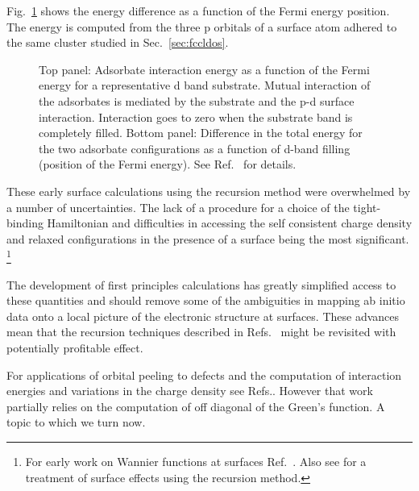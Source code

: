 %

Fig.~\ref{fig:burkesurface} shows the energy difference as a function of the 
Fermi energy position. The energy is computed from the three p orbitals of a 
surface atom adhered to the same cluster studied in Sec.~\ref{sec:fccldos}.
%
\begin{figure}
\begin{center}
{\graphicspath{{./invariance/rec_examples/exorpeel/}}}
\caption{Top panel: Adsorbate interaction energy as a function of the Fermi energy for a representative d band
substrate. Mutual interaction of the adsorbates is mediated by the substrate and the p-d surface interaction.
Interaction goes to zero when the substrate band is completely filled. 
Bottom panel: Difference in the total energy for the two adsorbate configurations as a function of
d-band filling (position of the Fermi energy). See Ref.~\cite{burke76} for details. \label{fig:burkesurface}}
\end{center}
\end{figure}
%

These early surface calculations using the recursion method were overwhelmed 
by a number of uncertainties. The lack of a procedure for a choice of the tight-binding 
Hamiltonian and difficulties in accessing the self consistent charge density
and relaxed configurations in the presence of a surface being the most significant.
\footnote{For early work on Wannier functions at surfaces Ref.~\cite{smith74}. Also see 
\cite{mostoller79} for a treatment of surface effects using the recursion method.}

The development of first principles calculations 
has greatly simplified access to these quantities and should remove 
some of the ambiguities in mapping ab initio data onto a local picture
of the electronic structure at surfaces. These advances mean that the 
recursion techniques described in Refs.~\cite{burke76, haydock79, haydock81} 
might be revisited with potentially profitable effect. 

For applications of orbital peeling to defects and the 
computation of interaction energies and variations in the charge density
see Refs.\cite{gibson93,gibson94}. However that work partially relies 
on the computation of off diagonal of the Green's function. A topic
to which we turn now.

